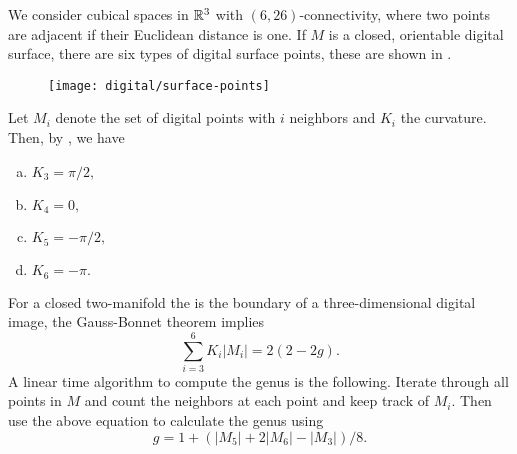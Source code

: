 We consider cubical spaces in $\mathbb{R}^3$ with $(6,26)$-connectivity,
where two points are adjacent if their Euclidean distance is one.
If $M$ is a closed, orientable digital surface, there are
six types of digital surface points, these are shown in .

\begin{figure}[htb]
        \centering
        \texttt{[image: digital/surface-points]}
		\caption{
		\label{fig:surface-points}}
\end{figure}

Let $M_i$ denote the set of digital points with $i$ neighbors and $K_i$
the curvature.
Then, by , we have
\begin{enumerate}[(a)]
\item $K_3=\pi/2,$
\item $K_4=0,$
\item $K_5=-\pi/2,$
\item $K_6=-\pi.$
\end{enumerate}

For a closed two-manifold the is the boundary of a three-dimensional
digital image, the Gauss-Bonnet theorem implies
$$\sum_{i=3}^6K_i |M_i|=2(2-2g).$$
A linear time algorithm to compute the genus is the following.
Iterate through all points in $M$ and count the neighbors at each point
and keep track of $M_i$. Then use the above equation to  calculate the genus
using 
$$g=1+(|M_5|+2|M_6|-|M_3|)/8.$$